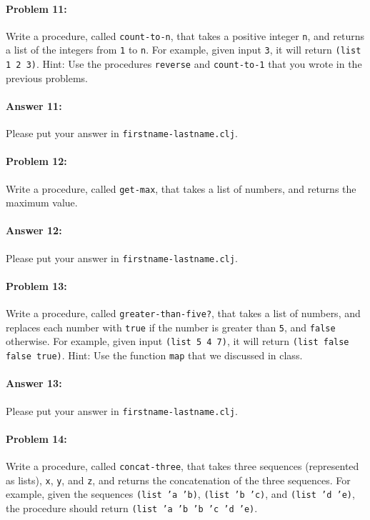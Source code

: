 \documentclass[10pt]{article}
\begin{document}
\paragraph{Problem 11:}
  Write a procedure, called \texttt{count-to-n}, that takes a positive
  integer \texttt{n}, and returns a list of the integers from
  \texttt{1} to \texttt{n}. For example, given input \texttt{3}, it
  will return \texttt{(list 1 2 3)}. Hint: Use the procedures
  \texttt{reverse} and \texttt{count-to-1} that you wrote in the
  previous problems.

\paragraph{Answer 11:} Please put your answer in \texttt{firstname-lastname.clj}.

\hrulefill
\paragraph{Problem 12:}
  Write a procedure, called \texttt{get-max}, that takes a list of numbers, and
  returns the maximum value.

\paragraph{Answer 12:} Please put your answer in \texttt{firstname-lastname.clj}.

\hrulefill
\paragraph{Problem 13:}
  Write a procedure, called \texttt{greater-than-five?}, that takes a
  list of numbers, and replaces each number with \texttt{true} if the
  number is greater than \texttt{5}, and \texttt{false} otherwise. For
  example, given input \texttt{(list 5 4 7)}, it will return
  \texttt{(list false false true)}. Hint: Use the function
  \texttt{map} that we discussed in class.

\paragraph{Answer 13:} Please put your answer in \texttt{firstname-lastname.clj}.

\hrulefill
\paragraph{Problem 14:}
Write a procedure, called \texttt{concat-three}, that takes three
sequences (represented as lists), \texttt{x}, \texttt{y}, and
\texttt{z}, and returns the concatenation of the three sequences. For
example, given the sequences \texttt{(list 'a 'b)}, \texttt{(list 'b
  'c)}, and \texttt{(list 'd 'e)}, the procedure should return
\texttt{(list 'a 'b 'b 'c 'd 'e)}.
\end{document}
